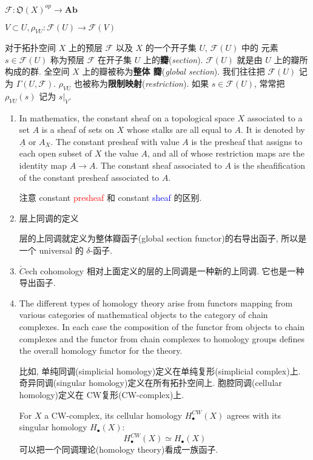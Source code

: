 \documentclass[UTF8]{ctexart}
\newcommand{\F}{\mathscr{F}}
\newcommand{\NBR}[1]{\mathfrak{O}(#1)}
\begin{document}
$\F \colon \NBR{X}^{op} \to \mathbf{A\!b}$

$V \subset U, \rho_{VU} : \F(U) \to \F(V)$

对于拓扑空间 $X$ 上的预层 $\F$ 以及 $X$ 的一个开子集 $U$, $\F(U)$ 中的
元素 $s \in \F(U)$ 称为预层 $\F$ 在开子集 $U$ 上的\textbf{瓣}(\textit{section}). $\F(U)$
就是由 $U$ 上的瓣所构成的群. 全空间 $X$ 上的瓣被称为\textbf{整体
  瓣}(\textit{global section}). 我们往往把 $\F(U)$ 记为 $\Gamma(U,
\F)$. $\rho_{VU}$ 也被称为\textbf{限制映射}(\textit{restriction}). 如果 $s \in
\F(U)$, 常常把 $\rho_{VU}(s)$ 记为 $s|_{V}$.

\begin{enumerate}
\item In mathematics, the constant sheaf on a topological space $X$ associated to a set $A$ is a sheaf of sets on $X$ whose stalks are all equal to $A$. It is denoted by $\underline{A}$ or $A_X$. The constant presheaf with value $A$ is the presheaf that assigns to each open subset of $X$ the value $A$, and all of whose restriction maps are the identity map $A\to A$. The constant sheaf associated to $A$ is the sheafification of the constant presheaf associated to $A$.\cite{constant_sheaf}

    注意 constant \textcolor{red}{presheaf} 和 constant \textcolor{blue}{sheaf} 的区别.

\item 层上同调的定义

层的上同调就定义为整体瓣函子(global section functor)的右导出函子, 所以是一个 universal 的 $\delta$-函子.


\item $\check{C}$ech cohomology 相对上面定义的层的上同调是一种新的上同调. 它也是一种导出函子.

\item The different types of homology theory arise from functors mapping from various categories of mathematical objects to the category of chain complexes. In each case the composition of the functor from objects to chain complexes and the functor from chain complexes to homology groups defines the overall homology functor for the theory.

比如, 单纯同调(simplicial homology)定义在单纯复形(simplicial complex)上. 奇异同调(singular homology)定义在所有拓扑空间上. 胞腔同调(cellular homology)定义在 CW复形(CW-complex)上.

For $X$ a CW-complex, its cellular homology $H^{CW}_\bullet(X)$ agrees with its singular homology $H_\bullet(X)$:
\[
H^{CW}_\bullet(X)\simeq H_\bullet(X)
\]
可以把一个同调理论(homology theory)看成一族函子.


\end{enumerate}
\end{document}
